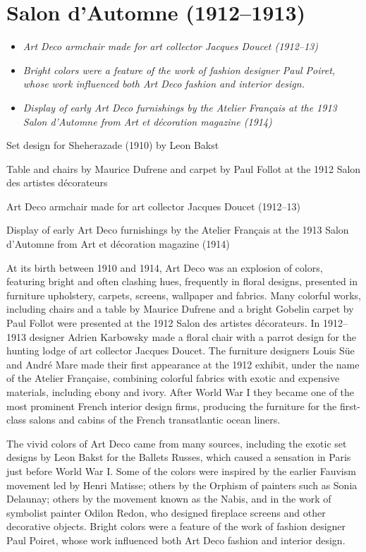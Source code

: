 \section{Salon d'Automne (1912--1913)}\label{salon-dautomne-19121913}

\begin{itemize}
\item
  \emph{Art Deco armchair made for art collector Jacques Doucet
  (1912--13)}
\item
  \emph{Bright colors were a feature of the work of fashion designer
  Paul Poiret, whose work influenced both Art Deco fashion and interior
  design.}
\item
  \emph{Display of early Art Deco furnishings by the Atelier Français at
  the 1913 Salon d'Automne from Art et décoration magazine (1914)}
\end{itemize}

Set design for Sheherazade (1910) by Leon Bakst

Table and chairs by Maurice Dufrene and carpet by Paul Follot at the
1912 Salon des artistes décorateurs

Art Deco armchair made for art collector Jacques Doucet (1912--13)

Display of early Art Deco furnishings by the Atelier Français at the
1913 Salon d'Automne from Art et décoration magazine (1914)

At its birth between 1910 and 1914, Art Deco was an explosion of colors,
featuring bright and often clashing hues, frequently in floral designs,
presented in furniture upholstery, carpets, screens, wallpaper and
fabrics. Many colorful works, including chairs and a table by Maurice
Dufrene and a bright Gobelin carpet by Paul Follot were presented at the
1912 Salon des artistes décorateurs. In 1912--1913 designer Adrien
Karbowsky made a floral chair with a parrot design for the hunting lodge
of art collector Jacques Doucet. The furniture designers Louis Süe and
André Mare made their first appearance at the 1912 exhibit, under the
name of the Atelier Française, combining colorful fabrics with exotic
and expensive materials, including ebony and ivory. After World War I
they became one of the most prominent French interior design firms,
producing the furniture for the first-class salons and cabins of the
French transatlantic ocean liners.

The vivid colors of Art Deco came from many sources, including the
exotic set designs by Leon Bakst for the Ballets Russes, which caused a
sensation in Paris just before World War I. Some of the colors were
inspired by the earlier Fauvism movement led by Henri Matisse; others by
the Orphism of painters such as Sonia Delaunay; others by the movement
known as the Nabis, and in the work of symbolist painter Odilon Redon,
who designed fireplace screens and other decorative objects. Bright
colors were a feature of the work of fashion designer Paul Poiret, whose
work influenced both Art Deco fashion and interior design.

